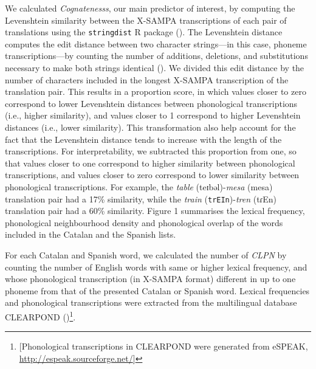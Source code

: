 \documentclass[
]{article}
\begin{document}
We calculated \emph{Cognatenesss}, our main predictor of interest, by
computing the Levenshtein similarity between the X-SAMPA transcriptions
of each pair of translations using the \texttt{stringdist} R package
(). The Levenshtein
distance computes the edit distance between two character strings---in
this case, phoneme transcriptions---by counting the number of additions,
deletions, and substitutions necessary to make both strings identical
(). We
divided this edit distance by the number of characters included in the
longest X-SAMPA transcription of the translation pair. This results in a
proportion score, in which values closer to zero correspond to lower
Levenshtein distances between phonological transcriptions (i.e., higher
similarity), and values closer to 1 correspond to higher Levenshtein
distances (i.e., lower similarity). This transformation also help
account for the fact that the Levenshtein distance tends to increase
with the length of the transcriptions. For interpretability, we
subtracted this proportion from one, so that values closer to one
correspond to higher similarity between phonological transcriptions, and
values closer to zero correspond to lower similarity between
phonological transcriptions. For example, the \emph{table}
(teɪbəl)-\emph{mesa} (mesa) translation pair had a 17\% similarity,
while the \emph{train} (\texttt{trEIn})-\emph{tren} (tɾEn) translation
pair had a 60\% similarity. Figure 1 summarises the lexical frequency,
phonological neighbourhood density and phonological overlap of the words
included in the Catalan and the Spanish lists.

For each Catalan and Spanish word, we calculated the number of
\emph{CLPN} by counting the number of English words with same or higher
lexical frequency, and whose phonological transcription (in X-SAMPA
format) different in up to one phoneme from that of the presented
Catalan or Spanish word. Lexical frequencies and phonological
transcriptions were extracted from the multilingual database CLEARPOND
()\footnote{{[}Phonological
  transcriptions in CLEARPOND were generated from eSPEAK,
  \url{http://espeak.sourceforge.net/}{]}}.
\end{document}
